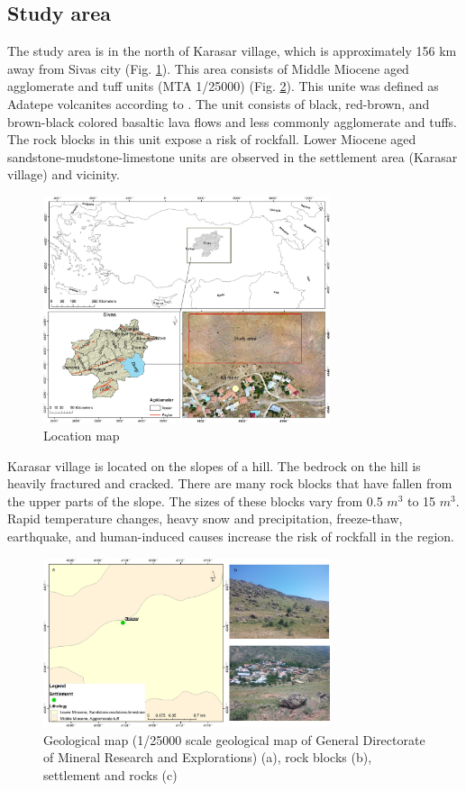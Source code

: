 \documentclass[a4paper,fleqn]{cas-sc}
\begin{document}
\subsection{Study area}
The study area is in the north of Karasar village, which is approximately 156 km away from Sivas city (Fig. \ref{fig:Figure1}). This area consists of Middle Miocene aged agglomerate and tuff units (MTA 1/25000) (Fig. \ref{fig:Figure2}). This unite was defined as Adatepe volcanites according to \citep{yilmaz2004divriugi}. The unit consists of black, red-brown, and brown-black colored basaltic lava flows and less commonly agglomerate and tuffs. The rock blocks in this unit expose a risk of rockfall. Lower Miocene aged sandstone-mudstone-limestone units are observed in the settlement area (Karasar village) and vicinity.
\begin{figure}
	\centering
	\includegraphics[width=0.75\textwidth]{figures/fig1.jpg}
	\caption{ Location map}
	\label{fig:Figure1}
\end{figure}

Karasar village is located on the slopes of a hill. The bedrock on the hill is heavily fractured and cracked. There are many rock blocks that have fallen from the upper parts of the slope. The sizes of these blocks vary from 0.5 $m^3$ to 15 $m^3$. Rapid temperature changes, heavy snow and precipitation, freeze-thaw, earthquake, and human-induced causes increase the risk of rockfall in the region.
\begin{figure}[pos=h]
	\centering
	\includegraphics[width=0.75\textwidth]{figures/fig2.jpg}
	\caption{ Geological map (1/25000 scale geological map of General Directorate of Mineral Research and Explorations) (a), rock blocks (b), settlement and rocks (c)}
	\label{fig:Figure2}
\end{figure}
\end{document}
